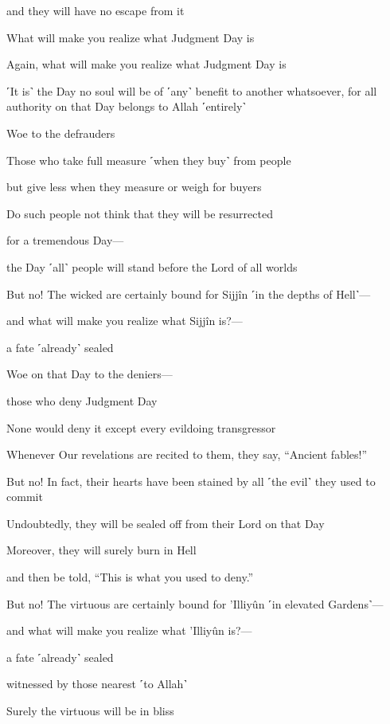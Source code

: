 and they will have no escape from it

What will make you realize what Judgment Day is

Again, what will make you realize what Judgment Day is

˹It is˺ the Day no soul will be of ˹any˺ benefit to another whatsoever, for all authority on that Day belongs to Allah ˹entirely˺

Woe to the defrauders

Those who take full measure ˹when they buy˺ from people

but give less when they measure or weigh for buyers

Do such people not think that they will be resurrected

for a tremendous Day—

the Day ˹all˺ people will stand before the Lord of all worlds

But no! The wicked are certainly bound for Sijjîn ˹in the depths of Hell˺—

and what will make you realize what Sijjîn is?—

a fate ˹already˺ sealed

Woe on that Day to the deniers—

those who deny Judgment Day

None would deny it except every evildoing transgressor

Whenever Our revelations are recited to them, they say, “Ancient fables!”

But no! In fact, their hearts have been stained by all ˹the evil˺ they used to commit

Undoubtedly, they will be sealed off from their Lord on that Day

Moreover, they will surely burn in Hell

and then be told, “This is what you used to deny.”

But no! The virtuous are certainly bound for ’Illiyûn ˹in elevated Gardens˺—

and what will make you realize what ’Illiyûn is?—

a fate ˹already˺ sealed

witnessed by those nearest ˹to Allah˺

Surely the virtuous will be in bliss

